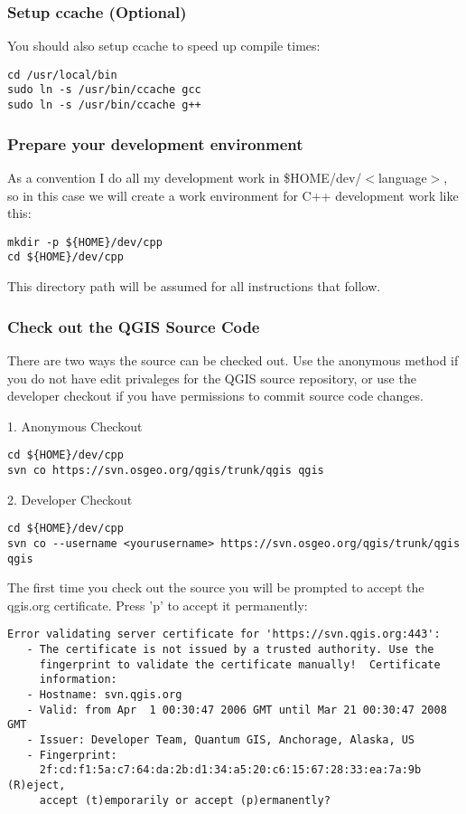 \subsubsection{Setup ccache (Optional)}
You should also setup ccache to speed up compile times:

\begin{verbatim}
cd /usr/local/bin 
sudo ln -s /usr/bin/ccache gcc 
sudo ln -s /usr/bin/ccache g++ 
\end{verbatim}

\subsubsection{Prepare your development environment}
As a convention I do all my development work in \$HOME/dev/$<$language$>$, so in
this case we will create a work environment for C++ development work like
this:

\begin{verbatim}
mkdir -p ${HOME}/dev/cpp 
cd ${HOME}/dev/cpp 
\end{verbatim}

This directory path will be assumed for all instructions that follow.

\subsubsection{Check out the QGIS Source Code}
There are two ways the source can be checked out. Use the anonymous method
if you do not have edit privaleges for the QGIS source repository, or use
  the developer checkout if you have permissions to commit source code
  changes.

1. Anonymous Checkout

\begin{verbatim}
cd ${HOME}/dev/cpp 
svn co https://svn.osgeo.org/qgis/trunk/qgis qgis
\end{verbatim}

2. Developer Checkout

\begin{verbatim}
cd ${HOME}/dev/cpp 
svn co --username <yourusername> https://svn.osgeo.org/qgis/trunk/qgis qgis 
\end{verbatim}

The first time you check out the source you will be prompted to accept the
qgis.org certificate. Press 'p' to accept it permanently:

\begin{verbatim}
Error validating server certificate for 'https://svn.qgis.org:443':
   - The certificate is not issued by a trusted authority. Use the
     fingerprint to validate the certificate manually!  Certificate
     information:
   - Hostname: svn.qgis.org
   - Valid: from Apr  1 00:30:47 2006 GMT until Mar 21 00:30:47 2008 GMT
   - Issuer: Developer Team, Quantum GIS, Anchorage, Alaska, US
   - Fingerprint:
     2f:cd:f1:5a:c7:64:da:2b:d1:34:a5:20:c6:15:67:28:33:ea:7a:9b (R)eject,
     accept (t)emporarily or accept (p)ermanently?  
\end{verbatim}

